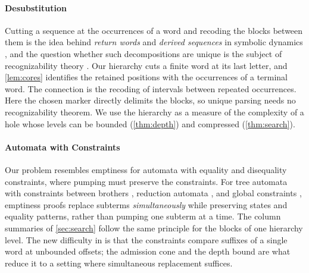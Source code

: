 \paragraph{Desubstitution}
Cutting a sequence at the occurrences of a word and recoding the blocks between them is the
idea behind \emph{return words} and \emph{derived sequences} in symbolic dynamics
\citep{Durand98}, and the question whether such decompositions are unique is the subject of
recognizability theory \citep{Mosse92}. Our hierarchy cuts a finite word at its last letter,
and \cref{lem:cores} identifies the retained positions with the occurrences of a terminal
word. The connection is the recoding of intervals between repeated
occurrences. Here the chosen marker directly delimits the blocks, so unique
parsing needs no recognizability theorem. We use the hierarchy as a measure of the
complexity of a hole whose levels can be bounded (\cref{thm:depth}) and compressed
(\cref{thm:search}).

\paragraph{Automata with Constraints}
Our problem resembles emptiness for automata with equality and disequality constraints, where
pumping must preserve the constraints. For tree automata with constraints between brothers
\citep{BogaertTison92}, reduction automata \citep{DauchetCaronCoquide95}, and global constraints
\citep{TATA,ComonJacquemard03,FiliotTalbotTison10,BargunoEtAl10}, emptiness proofs replace
subterms \emph{simultaneously} while preserving states and equality patterns, rather than
pumping one subterm at a time. The column summaries of \cref{sec:search} follow the same
principle for the blocks of one hierarchy level. The new difficulty in \NSSE is that the
constraints compare suffixes of a single word at unbounded offsets; the admission cone
and the depth bound are what reduce it to a setting where simultaneous replacement suffices.
